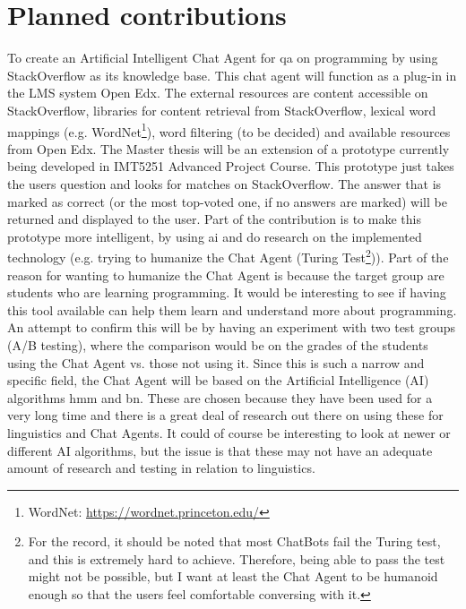 \section{Planned contributions}
\label{chapter2:planned_contribution}
To create an Artificial Intelligent Chat Agent for \gls{qa} on programming by using StackOverflow as its knowledge base. This chat agent will function as a plug-in in the LMS system 
Open Edx. The external resources are content accessible on StackOverflow, libraries for content retrieval from StackOverflow, lexical word mappings (e.g. WordNet\footnote{WordNet: 
\url{https://wordnet.princeton.edu/}}), word filtering (to be decided) and available resources from Open Edx.
\vspace{0.5em}\newline
The Master thesis will be an extension of a prototype currently being developed in IMT5251 Advanced Project Course. This prototype just takes the users question and looks for matches 
on StackOverflow. The answer that is marked as correct (or the most top-voted one, if no answers are marked) will be returned and displayed to the user. Part of the contribution is to 
make this prototype more intelligent, by using \gls{ai} and do research on the implemented technology (e.g. trying to humanize the Chat Agent (Turing Test\footnote{For the record, it 
should be noted that most ChatBots fail the Turing test, and this is extremely hard to achieve. Therefore, being able to pass the test might not be possible, but I want at least the 
Chat Agent to be humanoid enough so that the users feel comfortable conversing with it.})). Part of the reason for wanting to humanize the Chat Agent is because the target group are 
students who are learning programming. It would be interesting to see if having this tool available can help them learn and understand more about programming. An attempt to confirm 
this will be by having an experiment with two test groups (A/B testing), where the comparison would be on the grades of the students using the Chat Agent vs. those not using it. 
\vspace{0.5em}\newline
Since this is such a narrow and specific field, the Chat Agent will be based on the Artificial Intelligence (AI) algorithms  \gls{hmm} and 
\gls{bn}. These are chosen because they have been used for a very long time and there is a great deal of research out there on using these for linguistics and Chat Agents. It could 
of course be interesting to look at newer or different AI algorithms, but the issue is that these may not have an adequate amount of research and testing in relation to linguistics. 
